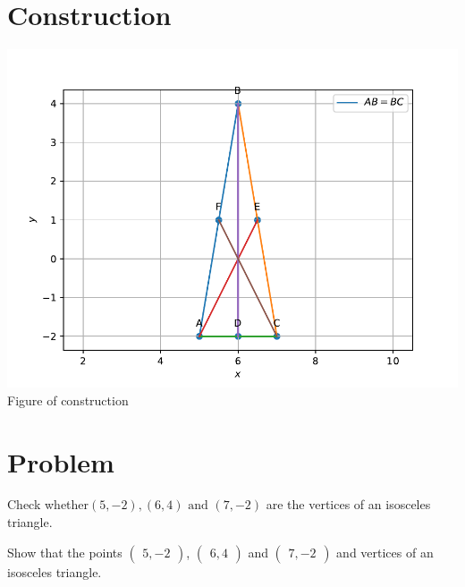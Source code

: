 \documentclass[10pt, a4paper]{article}
\title{\mytitle}
\author{\myauthor\hspace{1em}\\\contact\\FWC220107\hspace{6.5em}IITH\hspace{0.5em}\mymodule\hspace{6em}ASSIGN-1}
\date{}
\newcommand{\myvec}[1]{\ensuremath{\begin{pmatrix}#1\end{pmatrix}}}
\begin{document}
 \maketitle
 \tableofcontents
\section{Construction}                                                                    \begin{center}
  \includegraphics[scale=0.39]{par.pdf}
\\  Figure of construction
   \end{center}
 
   \section{Problem}
  Check whether$(5,-2),(6,4) \text{ and } (7,-2)$ are the vertices of an isosceles triangle.
   
 
Show that the points $\myvec{5, -2}$, $\myvec{6,4}$ and $\myvec{7, -2}$ and vertices of an isosceles  triangle.
	
\end{document}
